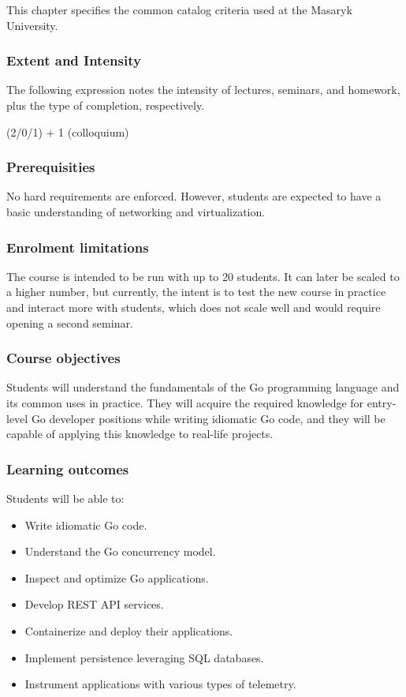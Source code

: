 \documentclass[
  digital,
  color,
  oneside,
  nosansbold,
  nocolorbold,
  lof,
  lot,
]{fithesis4}
\begin{document}
This chapter specifies the common catalog criteria used at the Masaryk University.

\subsubsection{Extent and Intensity}

The following expression notes the intensity of lectures, seminars, and homework, plus the type of completion, respectively.

(2/0/1) + 1 (colloquium)

\subsubsection{Prerequisities}

No hard requirements are enforced. However, students are expected to have a basic understanding of networking and virtualization.

\subsubsection{Enrolment limitations}

The course is intended to be run with up to 20 students. It can later be scaled to a higher number, but currently, the intent is to test the new course in practice and interact more with students, which does not scale well and would require opening a second seminar.

\subsubsection{Course objectives}

Students will understand the fundamentals of the Go programming language and its common uses in practice. They will acquire the required knowledge for entry-level Go developer positions while writing idiomatic Go code, and they will be capable of applying this knowledge to real-life projects.

\subsubsection{Learning outcomes}

Students will be able to:
\begin{itemize}
    \item Write idiomatic Go code.
    \item Understand the Go concurrency model.
    \item Inspect and optimize Go applications.
    \item Develop REST API services.
    \item Containerize and deploy their applications.
    \item Implement persistence leveraging SQL databases.
    \item Instrument applications with various types of telemetry.
\end{itemize}
\end{document}
